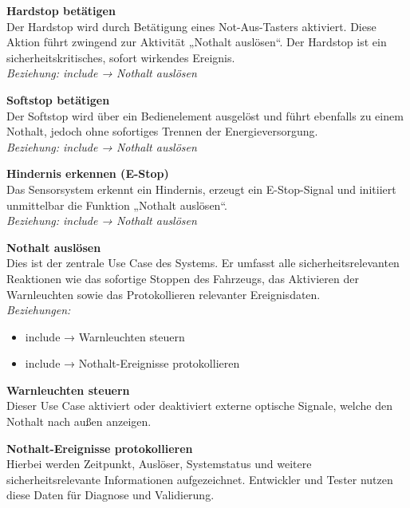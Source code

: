 \textbf{\ac{Hardstop} betätigen}\\
Der \ac{Hardstop} wird durch Betätigung eines Not-Aus-Tasters aktiviert. Diese Aktion
führt zwingend zur Aktivität „Nothalt auslösen“. Der \ac{Hardstop} ist ein
sicherheitskritisches, sofort wirkendes Ereignis.\\
\textit{Beziehung: include → Nothalt auslösen}

\vspace{0.5em}

\textbf{\ac{Softstop} betätigen}\\
Der \ac{Softstop} wird über ein Bedienelement ausgelöst und führt ebenfalls zu einem
Nothalt, jedoch ohne sofortiges Trennen der Energieversorgung.\\
\textit{Beziehung: include → Nothalt auslösen}

\vspace{0.5em}

\textbf{Hindernis erkennen (E-Stop)}\\
Das Sensorsystem erkennt ein Hindernis, erzeugt ein E-Stop-Signal und initiiert
unmittelbar die Funktion „Nothalt auslösen“.\\
\textit{Beziehung: include → Nothalt auslösen}

\vspace{0.5em}

\textbf{Nothalt auslösen}\\
Dies ist der zentrale Use Case des Systems. Er umfasst alle
sicherheitsrelevanten Reaktionen wie das sofortige Stoppen des Fahrzeugs, das
Aktivieren der Warnleuchten sowie das Protokollieren relevanter
Ereignisdaten.\\
\textit{Beziehungen:}
\begin{itemize}
    \item include → Warnleuchten steuern
    \item include → Nothalt-Ereignisse protokollieren
\end{itemize}

\vspace{0.5em}

\textbf{Warnleuchten steuern}\\
Dieser Use Case aktiviert oder deaktiviert externe optische Signale, welche den
Nothalt nach außen anzeigen.

\vspace{0.5em}

\textbf{Nothalt-Ereignisse protokollieren}\\
Hierbei werden Zeitpunkt, Auslöser, Systemstatus und weitere
sicherheitsrelevante Informationen aufgezeichnet. Entwickler und Tester nutzen
diese Daten für Diagnose und Validierung.


